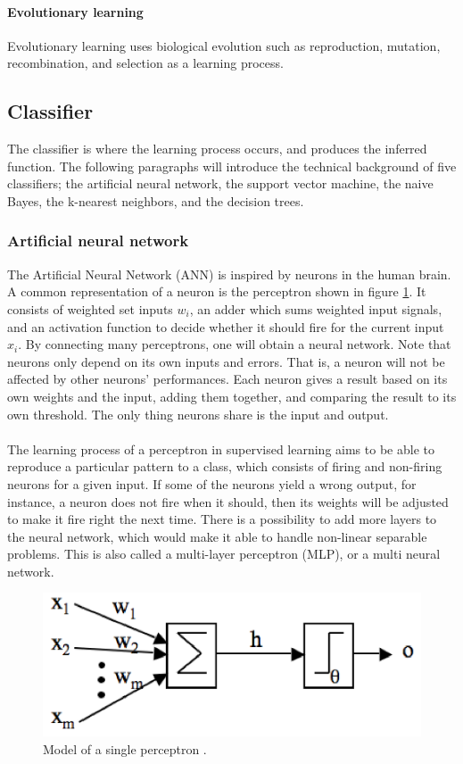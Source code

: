 \documentclass[USenglish]{ifimaster}  %
\begin{document}
\paragraph{Evolutionary learning}
Evolutionary learning uses biological evolution such as reproduction, mutation, recombination, and selection as a learning process.
	
 \subsection{Classifier} \label{sub:classifier}
The classifier is where the learning process occurs, and produces the inferred function. The following paragraphs will introduce the technical background of five classifiers; the artificial neural network, the support vector machine, the naive Bayes, the k-nearest neighbors, and the decision trees.

\subsubsection{Artificial neural network}
The Artificial Neural Network (ANN) is inspired by neurons in the human brain. A common representation of a neuron is the perceptron shown in figure \ref{fig:NN}. It consists of weighted set inputs $w_i$, an adder which sums weighted input signals, and an activation function to decide whether it should fire for the current input $x_i$. By connecting many perceptrons, one will obtain a neural network. Note that neurons only depend on its own inputs and errors. That is, a neuron will not be affected by other neurons’ performances. Each neuron gives a result based on its own weights and the input, adding them together, and comparing the result to its own threshold. The only thing neurons share is the input and output. 
\\
\\
The learning process of a perceptron in supervised learning aims to be able to reproduce a particular pattern to a class, which consists of firing and non-firing neurons for a given input. If some of the neurons yield a wrong output, for instance, a neuron does not fire when it should, then its weights will be adjusted to make it fire right the next time. There is a possibility to add more layers to the neural network, which would make it able to handle non-linear separable problems. This is also called a multi-layer perceptron (MLP), or a multi neural network.

	
\begin{figure}[h]
	\centering
	\includegraphics[scale=0.9]{Figures/neuron2.PNG}
	\caption[Model of a single perceptron]{Model of a single perceptron \cite{Marsland:2009:MLA:1571643}.}
	\label{fig:NN}
\end{figure}
	
\end{document}
